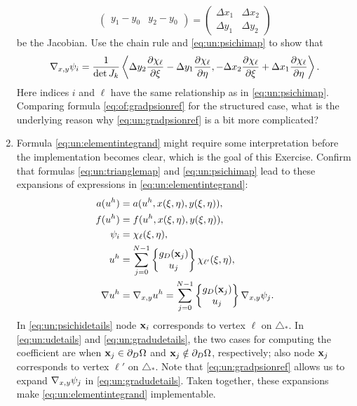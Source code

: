 \begin{enumerate}
$$\begin{pmatrix}
    y_1 - y_0 & y_2 - y_0 \end{pmatrix}
    = \begin{pmatrix}
    \Delta x_1 & \Delta x_2 \\
    \Delta y_1 & \Delta y_2
    \end{pmatrix}$$
be the Jacobian.  Use the chain rule and \eqref{eq:un:psichimap} to show that
\begin{equation}
\nabla_{x,y} \psi_i = \frac{1}{\det J_k} \left<\Delta y_2 \frac{\partial \chi_\ell}{\partial \xi} - \Delta y_1 \frac{\partial \chi_\ell}{\partial \eta}, - \Delta x_2 \frac{\partial \chi_\ell}{\partial \xi} + \Delta x_1 \frac{\partial \chi_\ell}{\partial \eta}\right>. \label{eq:un:gradpsionref}
\end{equation}
Here indices $i$ and $\ell$ have the same relationship as in \eqref{eq:un:psichimap}.  Comparing formula \eqref{eq:of:gradpsionref} for the structured case, what is the underlying reason why \eqref{eq:un:gradpsionref} is a bit more complicated?  %
\item  \label{exer:un:elementintegranddetails}  Formula \eqref{eq:un:elementintegrand} might require some interpretation before the implementation becomes clear, which is the goal of this Exercise.  Confirm that formulas \eqref{eq:un:trianglemap} and \eqref{eq:un:psichimap} lead to these expansions of expressions in \eqref{eq:un:elementintegrand}:
\begin{align}
a(u^h) &= a(u^h,x(\xi,\eta),y(\xi,\eta)), \label{eq:un:adetails} \\
f(u^h) &= f(u^h,x(\xi,\eta),y(\xi,\eta)), \label{eq:un:fdetails} \\
\psi_i &= \chi_{\ell}(\xi,\eta), \label{eq:un:psichidetails} \\
u^h &= \sum_{j=0}^{N-1} \left\{\begin{matrix} g_D(\mathbf{x}_j) \\ u_j \end{matrix}\right\} \chi_{\ell'}(\xi,\eta), \label{eq:un:udetails} \\
\nabla u^h &= \nabla_{x,y} u^h = \sum_{j=0}^{N-1} \left\{\begin{matrix} g_D(\mathbf{x}_j) \\ u_j \end{matrix}\right\} \nabla_{x,y} \psi_j. \label{eq:un:gradudetails}
\end{align}
In \eqref{eq:un:psichidetails} node $\mathbf{x}_i$ corresponds to vertex $\ell$ on $\triangle_\ast$.  In \eqref{eq:un:udetails} and \eqref{eq:un:gradudetails}, the two cases for computing the coefficient are when $\mathbf{x}_j \in \partial_D \Omega$ and $\mathbf{x}_j \notin \partial_D \Omega$, respectively; also node $\mathbf{x}_j$ corresponds to vertex $\ell'$ on $\triangle_\ast$.  Note that \eqref{eq:un:gradpsionref} allows us to expand $\nabla_{x,y} \psi_j$ in \eqref{eq:un:gradudetails}.  Taken together, these expansions make \eqref{eq:un:elementintegrand} implementable.

\end{enumerate}
